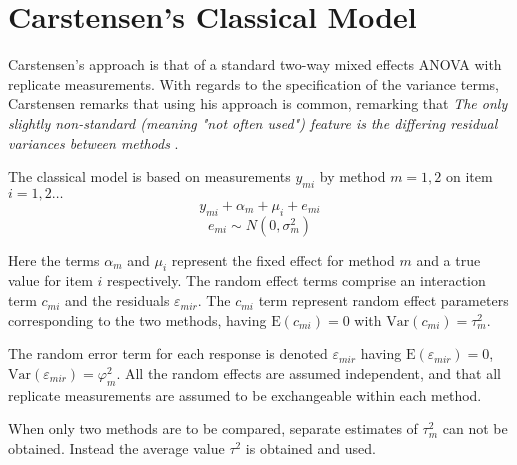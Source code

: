 \documentclass[12pt, a4paper]{report}
\theoremstyle{plain}
\theoremstyle{definition}
\theoremstyle{remark}
\begin{document}
\section{Carstensen's Classical Model}
Carstensen's approach is that of a standard two-way mixed effects ANOVA with replicate measurements. With regards to the specification of the variance terms, Carstensen remarks that using his approach is common, remarking that \emph{
	The only slightly non-standard (meaning "not often used") feature is the differing residual variances between methods }\citep{bxc2010}.


The classical model is based on measurements $y_{mi}$ by method $m=1,2$ on item $i = 1,2 \ldots$
\[y_{mi} + \alpha_{m} + \mu_{i} + e_{mi}\]
\[e_{mi} \sim N(0,\sigma^2_m)\]


Here the terms $\alpha_{m}$ and $\mu_{i}$ represent the fixed effect for method $m$ and a true value for item $i$ respectively. The random effect terms comprise an interaction term $c_{mi}$ and the residuals $\varepsilon_{mir}$.
The $c_{mi}$ term represent random effect parameters corresponding to the two methods, having $\mathrm{E}(c_{mi})= 0$ with $\mathrm{Var}(c_{mi})=\tau^2_m$.  


The random error term for each response is denoted $\varepsilon_{mir}$ having $\mathrm{E}(\varepsilon_{mir})=0$, $\mathrm{Var}(\varepsilon_{mir})=\varphi^2_m$. All the random effects are assumed independent, and that all replicate measurements are assumed to be exchangeable within each method.


When only two methods are to be compared, separate estimates of $\tau^2_m$ can not be obtained. Instead the average value $\tau^2$ is obtained and used.





\end{document}
